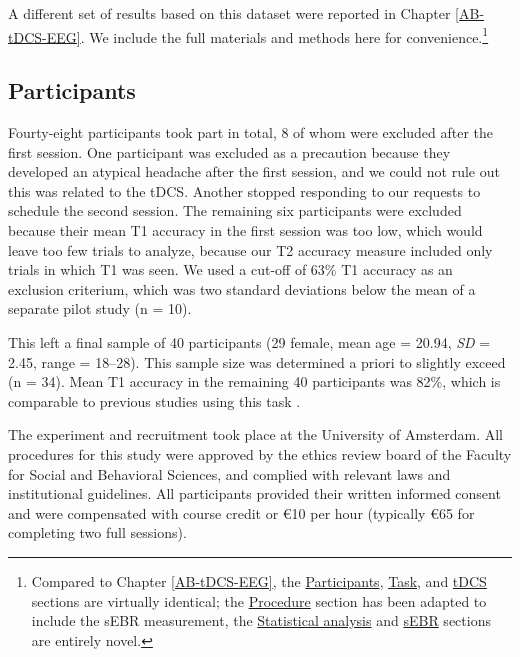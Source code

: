 \documentclass[11pt,english,]{memoir}
\let\rmarkdownfootnote\footnote%
\def\footnote{\protect\rmarkdownfootnote}
\begin{document}
A different set of results based on this dataset were reported in Chapter \ref{AB-tDCS-EEG}. We include the full materials and methods here for convenience.\footnote{Compared to Chapter \ref{AB-tDCS-EEG}, the \protect\hyperlink{AB_sEBR-participants}{Participants}, \protect\hyperlink{AB_sEBR-task}{Task}, and \protect\hyperlink{AB_sEBR-tDCS}{tDCS} sections are virtually identical; the \protect\hyperlink{AB_sEBR-procedure}{Procedure} section has been adapted to include the sEBR measurement, the \protect\hyperlink{AB_sEBR-stats}{Statistical analysis} and \protect\hyperlink{AB_sEBR-sEBR}{sEBR} sections are entirely novel.}

\hypertarget{AB_sEBR-participants}{%
\subsection{Participants}\label{AB_sEBR-participants}}

Fourty-eight participants took part in total, 8 of whom were excluded after the first session. One participant was excluded as a precaution because they developed an atypical headache after the first session, and we could not rule out this was related to the tDCS. Another stopped responding to our requests to schedule the second session. The remaining six participants were excluded because their mean T1 accuracy in the first session was too low, which would leave too few trials to analyze, because our T2 accuracy measure included only trials in which T1 was seen. We used a cut-off of 63\% T1 accuracy as an exclusion criterium, which was two standard deviations below the mean of a separate pilot study (n = 10).

This left a final sample of 40 participants (29 female, mean age = 20.94, \emph{SD} = 2.45, range = 18--28). This sample size was determined a priori to slightly exceed \textcite{London2015} (n = 34). Mean T1 accuracy in the remaining 40 participants was 82\%, which is comparable to previous studies using this task \autocites[86\% in][]{London2015}[in 82\% in][]{Slagter2013}.

The experiment and recruitment took place at the University of Amsterdam. All procedures for this study were approved by the ethics review board of the Faculty for Social and Behavioral Sciences, and complied with relevant laws and institutional guidelines. All participants provided their written informed consent and were compensated with course credit or €10 per hour (typically €65 for completing two full sessions).
\end{document}
